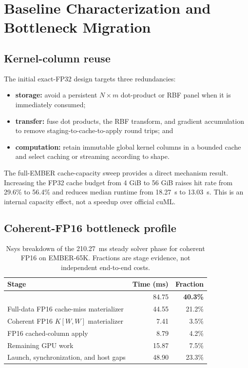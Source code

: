 \section{Baseline Characterization and Bottleneck Migration}

\subsection{Kernel-column reuse}

The initial exact-FP32 design targets three redundancies:

\begin{itemize}
  \item \textbf{storage:} avoid a persistent $N\times m$ dot-product or RBF
        panel when it is immediately consumed;
  \item \textbf{transfer:} fuse dot products, the RBF transform, and gradient
        accumulation to remove staging-to-cache-to-apply round trips; and
  \item \textbf{computation:} retain immutable global kernel columns in a
        bounded cache and select caching or streaming according to shape.
\end{itemize}

The full-EMBER cache-capacity sweep provides a direct mechanism result.
Increasing the FP32 cache budget from 4 GiB to 56 GiB raises hit rate from
29.6\% to 56.4\% and reduces median runtime from \SI{18.27}{s} to
\SI{13.03}{s}. This is an internal capacity effect, not a speedup over
official cuML.

\subsection{Coherent-FP16 bottleneck profile}

\begin{table}[t]
  \centering
  \caption{Nsys breakdown of the \SI{210.27}{ms} steady solver phase for
  coherent FP16 on EMBER-65K. Fractions are stage evidence, not independent
  end-to-end costs.}
  \label{tab:profile}
  \begin{tabularx}{\textwidth}{@{}Yrr@{}}
    \toprule
    Stage & Time (ms) & Fraction \\
    \midrule
     & 84.75 & \textbf{40.3\%} \\
    Full-data FP16 cache-miss materializer & 44.55 & 21.2\% \\
    Coherent FP16 $K[W,W]$ materializer & 7.41 & 3.5\% \\
    FP16 cached-column apply & 8.79 & 4.2\% \\
    Remaining GPU work & 15.87 & 7.5\% \\
    Launch, synchronization, and host gaps & 48.90 & 23.3\% \\
    \bottomrule
  \end{tabularx}
\end{table}

